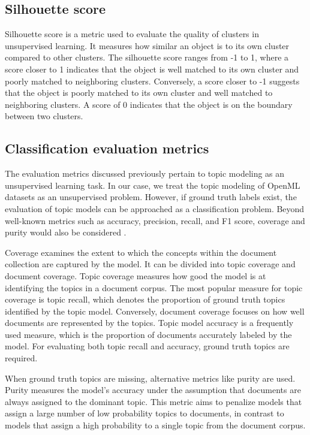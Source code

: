 \subsection{Silhouette score}
\label{sec:silhouette_score}
Silhouette score \cite{shahapure_cluster_2020} is a metric used to evaluate the quality of clusters in unsupervised learning. It measures how similar an object is to its own cluster compared to other clusters. The silhouette score ranges from -1 to 1, where a score closer to 1 indicates that the object is well matched to its own cluster and poorly matched to neighboring clusters. Conversely, a score closer to -1 suggests that the object is poorly matched to its own cluster and well matched to neighboring clusters. A score of 0 indicates that the object is on the boundary between two clusters.

\subsection{Classification evaluation metrics}

The evaluation metrics discussed previously pertain to topic modeling as an unsupervised learning task. In our case, we treat the topic modeling of OpenML datasets as an unsupervised problem. However, if ground truth labels exist, the evaluation of topic models can be approached as a classification problem. Beyond well-known metrics such as accuracy, precision, recall, and F1 score, coverage and purity would also be considered \cite{churchill_evolution_2022}.

Coverage examines the extent to which the concepts within the document collection are captured by the model. It can be divided into topic coverage and document coverage. Topic coverage measures how good the model is at identifying the topics in a document corpus. The most popular measure for topic coverage is topic recall, which denotes the proportion of ground truth topics identified by the topic model. Conversely, document coverage focuses on how well documents are represented by the topics. Topic model accuracy is a frequently used measure, which is the proportion of documents accurately labeled by the model. For evaluating both topic recall and accuracy, ground truth topics are required.

When ground truth topics are missing, alternative metrics like purity are used. Purity measures the model's accuracy under the assumption that documents are always assigned to the dominant topic. This metric aims to penalize models that assign a large number of low probability topics to documents, in contrast to models that assign a high probability to a single topic from the document corpus.

